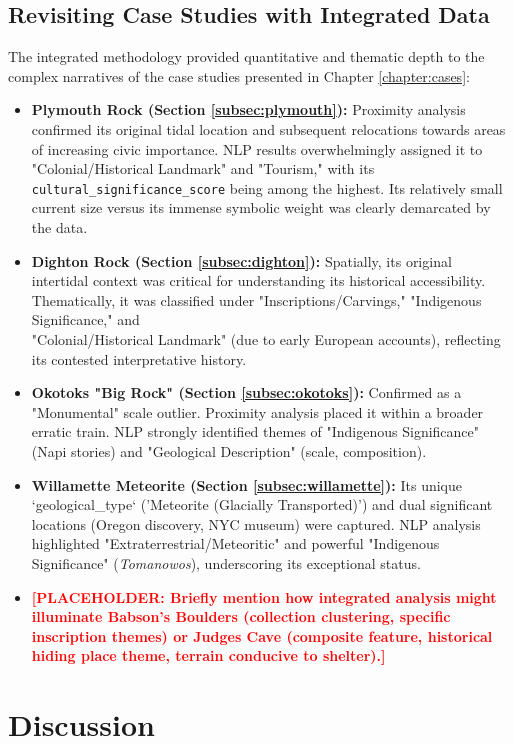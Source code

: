 \documentclass[
11pt, %
english, %
singlespacing, %
headsepline, %
]{MastersDoctoralThesis} %
\newcommand{\placeholdertext}[1]{\textcolor{red}{\textbf{[PLACEHOLDER: #1]}}}
\begin{document}
\subsection{Revisiting Case Studies with Integrated Data}
\label{subsec:revisiting_case_studies_integrated}
The integrated methodology provided quantitative and thematic depth to the complex narratives of the case studies presented in Chapter \ref{chapter:cases}:
\begin{itemize}
    \item \textbf{Plymouth Rock (Section \ref{subsec:plymouth}):} Proximity analysis confirmed its original tidal location and subsequent relocations towards areas of increasing civic importance. NLP results overwhelmingly assigned it to "Colonial/Historical Landmark" and "Tourism," with its \texttt{cultural\_significance\_score} being among the highest. Its relatively small current size versus its immense symbolic weight was clearly demarcated by the data.
    \item \textbf{Dighton Rock (Section \ref{subsec:dighton}):} Spatially, its original intertidal context was critical for understanding its historical accessibility. Thematically, it was classified under "Inscriptions/Carvings," "Indigenous Significance," and \\"Colonial/Historical Landmark" (due to early European accounts), reflecting its contested interpretative history.
    \item \textbf{Okotoks "Big Rock" (Section \ref{subsec:okotoks}):} Confirmed as a "Monumental" scale outlier. Proximity analysis placed it within a broader erratic train. NLP strongly identified themes of "Indigenous Significance" (Napi stories) and "Geological Description" (scale, composition).
    \item \textbf{Willamette Meteorite (Section \ref{subsec:willamette}):} Its unique `geological\_type` ('Meteorite (Glacially Transported)') and dual significant locations (Oregon discovery, NYC museum) were captured. NLP analysis highlighted "Extraterrestrial/Meteoritic" and powerful "Indigenous Significance" (\emph{Tomanowos}), underscoring its exceptional status.
    \item \placeholdertext{Briefly mention how integrated analysis might illuminate Babson's Boulders (collection clustering, specific inscription themes) or Judges Cave (composite feature, historical hiding place theme, terrain conducive to shelter).}
\end{itemize}

\section{Discussion}
\label{sec:discussion_results}
\end{document}
